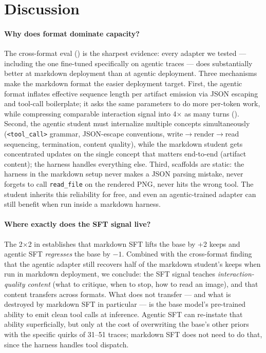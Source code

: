 \documentclass[11pt]{article}
\begin{document}
\section{Discussion}
\label{sec:discussion}

\paragraph{Why does format dominate capacity?} The cross-format eval () is the sharpest evidence: every adapter we tested --- including the one fine-tuned specifically on agentic traces --- does substantially better at markdown deployment than at agentic deployment. Three mechanisms make the markdown format the easier deployment target.
First, the agentic format inflates effective sequence length per artifact emission via JSON escaping and tool-call boilerplate; it asks the same parameters to do more per-token work, while compressing comparable interaction signal into 4$\times$ as many turns ().
Second, the agentic student must internalize multiple concepts simultaneously (\texttt{<tool\_call>} grammar, JSON-escape conventions, write$\to$render$\to$read sequencing, termination, content quality), while the markdown student gets concentrated updates on the single concept that matters end-to-end (artifact content); the harness handles everything else.
Third, scaffolds are static: the harness in the markdown setup never makes a JSON parsing mistake, never forgets to call \texttt{read\_file} on the rendered PNG, never hits the wrong tool. The student inherits this reliability for free, and even an agentic-trained adapter can still benefit when run inside a markdown harness.

\paragraph{Where exactly does the SFT signal live?} The 2$\times$2 in  establishes that markdown SFT lifts the base by +2 keeps and agentic SFT \emph{regresses} the base by $-1$. Combined with the cross-format finding that the agentic adapter still recovers half of the markdown student's keeps when run in markdown deployment, we conclude: the SFT signal teaches \emph{interaction-quality content} (what to critique, when to stop, how to read an image), and that content transfers across formats. What does not transfer --- and what is destroyed by markdown SFT in particular --- is the base model's pre-trained ability to emit clean tool calls at inference. Agentic SFT can re-instate that ability superficially, but only at the cost of overwriting the base's other priors with the specific quirks of 31--51 traces; markdown SFT does not need to do that, since the harness handles tool dispatch.
\end{document}
